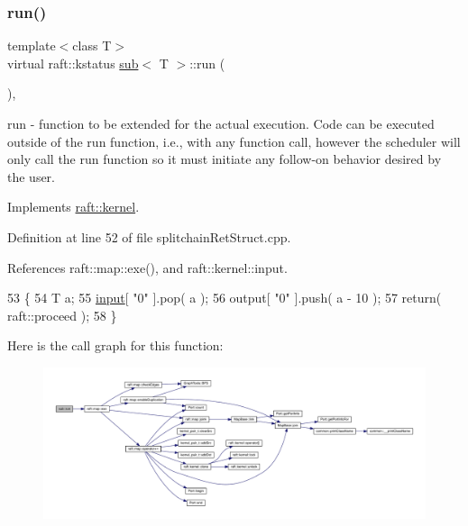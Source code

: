 \subsubsection{\texorpdfstring{run()}{run()}\hspace{0.1cm}{\footnotesize\ttfamily [12/12]}}
{\footnotesize\ttfamily template$<$class T$>$ \\
virtual raft\+::kstatus \hyperlink{classsub}{sub}$<$ T $>$\+::run (\begin{DoxyParamCaption}{ }\end{DoxyParamCaption})\hspace{0.3cm}{\ttfamily [inline]}, {\ttfamily [virtual]}}

run -\/ function to be extended for the actual execution. Code can be executed outside of the run function, i.\+e., with any function call, however the scheduler will only call the run function so it must initiate any follow-\/on behavior desired by the user. 

Implements \hyperlink{classraft_1_1kernel_a05094286d7577360fb1b91c91fc05901}{raft\+::kernel}.



Definition at line 52 of file splitchain\+Ret\+Struct.\+cpp.



References raft\+::map\+::exe(), and raft\+::kernel\+::input.


\begin{DoxyCode}
53     \{
54         T a;
55         \hyperlink{classraft_1_1kernel_a6edbe35a56409d402e719b3ac36d6554}{input}[ \textcolor{stringliteral}{"0"} ].pop( a );
56         output[ \textcolor{stringliteral}{"0"} ].push( a - 10 );
57         \textcolor{keywordflow}{return}( raft::proceed );
58     \}
\end{DoxyCode}
Here is the call graph for this function\+:
\nopagebreak
\begin{figure}[H]
\begin{center}
\leavevmode
\includegraphics[width=350pt]{classsub_a0a0c7461433ee8b5f4b24305282bf69a_cgraph}
\end{center}
\end{figure}


